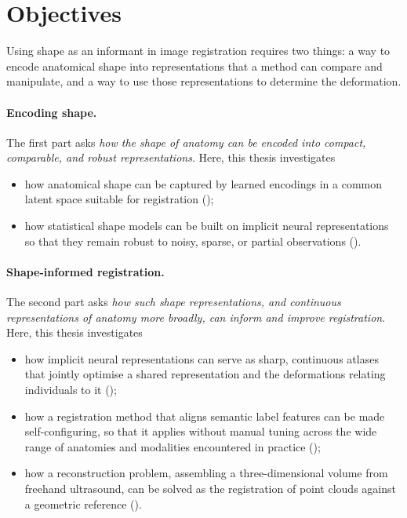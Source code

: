\section{Objectives}
\label{sec:objectives}

Using shape as an informant in image registration requires two things: a way to encode anatomical shape into representations that a method can compare and manipulate, and a way to use those representations to determine the deformation.


\paragraph{Encoding shape.} The first part asks \emph{how the shape of anatomy can be encoded into compact, comparable, and robust representations}. Here, this thesis investigates
\begin{itemize}
    \item how anatomical shape can be captured by learned encodings in a common latent space suitable for registration ();
    \item how statistical shape models can be built on implicit neural representations so that they remain robust to noisy, sparse, or partial observations ().
\end{itemize}

\paragraph{Shape-informed registration.} The second part asks \emph{how such shape representations, and continuous representations of anatomy more broadly, can inform and improve registration}. Here, this thesis investigates
\begin{itemize}
    \item how implicit neural representations can serve as sharp, continuous atlases that jointly optimise a shared representation and the deformations relating individuals to it ();
    \item how a registration method that aligns semantic label features can be made self-configuring, so that it applies without manual tuning across the wide range of anatomies and modalities encountered in practice ();
    \item how a reconstruction problem, assembling a three-dimensional volume from freehand ultrasound, can be solved as the registration of point clouds against a geometric reference ().
\end{itemize}

